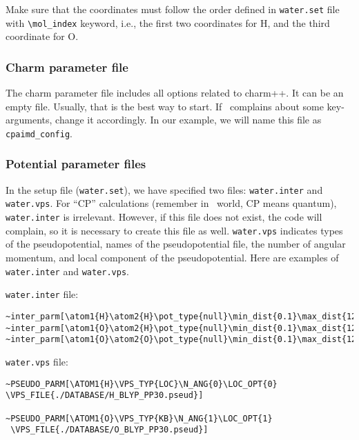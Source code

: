Make sure that the coordinates must follow the order defined in \verb+water.set+ file with \verb+\mol_index+ keyword, i.e., the first two coordinates for H, and the third coordinate for O. 

\subsubsection{Charm parameter file}

The charm parameter file includes all options related to charm++. It can be an empty file. Usually, that is the best way to start. If  \openatom \ complains about some key-arguments, change it accordingly. In our example, we will name this file as \verb+cpaimd_config+.


\subsubsection{Potential parameter files}

In the setup file (\verb+water.set+), we have specified two files: \verb+water.inter+ and \verb+water.vps+. For ``CP'' calculations (remember in \openatom \ world, CP means quantum), \verb+water.inter+ is irrelevant. However, if this file does not exist, the code will complain, so it is necessary to create this file as well. \verb+water.vps+ indicates types of the pseudopotential, names of the pseudopotential file, the number of angular momentum, and local component of the pseudopotential. Here are examples of \verb+water.inter+ and \verb+water.vps+.

\verb+water.inter+ file:

\begin{verbatim}
~inter_parm[\atom1{H}\atom2{H}\pot_type{null}\min_dist{0.1}\max_dist{12.9}]
~inter_parm[\atom1{O}\atom2{H}\pot_type{null}\min_dist{0.1}\max_dist{12.9}]
~inter_parm[\atom1{O}\atom2{O}\pot_type{null}\min_dist{0.1}\max_dist{12.9}]
\end{verbatim}

\verb+water.vps+ file:

\begin{verbatim}
~PSEUDO_PARM[\ATOM1{H}\VPS_TYP{LOC}\N_ANG{0}\LOC_OPT{0}
\VPS_FILE{./DATABASE/H_BLYP_PP30.pseud}]

~PSEUDO_PARM[\ATOM1{O}\VPS_TYP{KB}\N_ANG{1}\LOC_OPT{1}
 \VPS_FILE{./DATABASE/O_BLYP_PP30.pseud}]

\end{verbatim}

